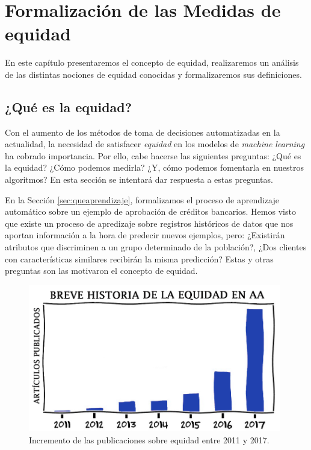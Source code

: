 \documentclass[oneside,openright,titlepage,numbers=noenddot,openany,headinclude,footinclude=true,
cleardoublepage=empty,abstractoff,BCOR=5mm,paper=a4,fontsize=12pt,main=spanish]{scrreprt}
\begin{document}
\chapter{Formalización de las Medidas de equidad} \label{ch:formalmedeq}

En este capítulo presentaremos el concepto de equidad, realizaremos un análisis de las distintas nociones de equidad conocidas y formalizaremos sus definiciones.

\section{¿Qué es la equidad?}

Con el aumento de los métodos de toma de decisiones automatizadas en la actualidad, la necesidad de satisfacer \textit{equidad} en los modelos de \textit{machine learning} ha cobrado importancia. Por ello, cabe hacerse las siguientes preguntas: ¿Qué es la equidad? ¿Cómo podemos medirla? ¿Y, cómo podemos fomentarla en nuestros algoritmos? En esta sección se intentará dar respuesta a estas preguntas.

En la Sección \ref{sec:queaprendizaje}, formalizamos el proceso de aprendizaje automático sobre un ejemplo de aprobación de créditos bancarios. Hemos visto que existe un proceso de apredizaje sobre registros históricos de datos que nos aportan información a la hora de predecir nuevos ejemplos, pero: ¿Existirán atributos que discriminen a un grupo determinado de la población?, ¿Dos clientes con características similares recibirán la misma predicción? Estas y otras preguntas son las motivaron el concepto de equidad.\\

\begin{figure}[h]
	\centering
	\includegraphics[width=11.05cm]{exponencial.png}
	\caption{Incremento de las publicaciones sobre equidad entre 2011 y 2017.}
\end{figure}
\end{document}
